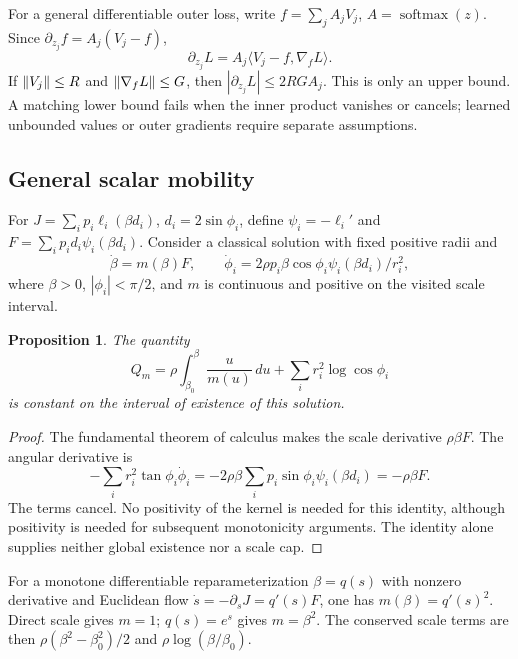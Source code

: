 \documentclass[10pt,a4paper]{article}
\newtheorem{proposition}{Proposition}[section]
\begin{document}
For a general differentiable outer loss, write $f=\sum_j A_jV_j$, $A=\operatorname{softmax}(z)$. Since $\partial_{z_j}f=A_j(V_j-f)$,
\[
\partial_{z_j}L=A_j\langle V_j-f,\nabla_fL\rangle.
\]
If $\lVert V_j\rVert\le R$ and $\lVert\nabla_fL\rVert\le G$, then $|\partial_{z_j}L|\le2RG A_j$. This is only an upper bound. A matching lower bound fails when the inner product vanishes or cancels; learned unbounded values or outer gradients require separate assumptions.

\subsection{General scalar mobility}
For $J=\sum_i p_i\ell_i(\beta d_i)$, $d_i=2\sin\phi_i$, define $\psi_i=-\ell_i'$ and $F=\sum_i p_i d_i\psi_i(\beta d_i)$. Consider a classical solution with fixed positive radii and
\[
\dot\beta=m(\beta)F,\qquad
\dot\phi_i=2\rho p_i\beta\cos\phi_i\psi_i(\beta d_i)/r_i^2,
\]
where $\beta>0$, $|\phi_i|<\pi/2$, and $m$ is continuous and positive on the visited scale interval.
\begin{proposition}
The quantity
\[
Q_m=\rho\int_{\beta_0}^{\beta}\frac{u}{m(u)}\,du+\sum_i r_i^2\log\cos\phi_i
\]
is constant on the interval of existence of this solution.
\end{proposition}
\begin{proof}
The fundamental theorem of calculus makes the scale derivative $\rho\beta F$. The angular derivative is
\[
-\sum_i r_i^2\tan\phi_i\dot\phi_i
=-2\rho\beta\sum_i p_i\sin\phi_i\psi_i(\beta d_i)
=-\rho\beta F.
\]
The terms cancel. No positivity of the kernel is needed for this identity, although positivity is needed for subsequent monotonicity arguments. The identity alone supplies neither global existence nor a scale cap.
\end{proof}
For a monotone differentiable reparameterization $\beta=q(s)$ with nonzero derivative and Euclidean flow $\dot s=-\partial_sJ=q'(s)F$, one has $m(\beta)=q'(s)^2$. Direct scale gives $m=1$; $q(s)=e^s$ gives $m=\beta^2$. The conserved scale terms are then $\rho(\beta^2-\beta_0^2)/2$ and $\rho\log(\beta/\beta_0)$.
\end{document}
